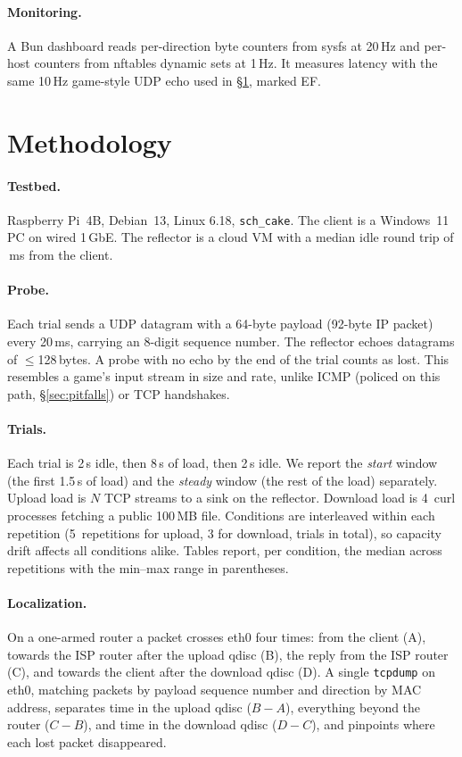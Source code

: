 \documentclass[10pt,twocolumn]{article}
\begin{document}
\paragraph{Monitoring.} A Bun dashboard reads per-direction byte counters from
sysfs at 20\,Hz and per-host counters from nftables dynamic sets at 1\,Hz. It
measures latency with the same 10\,Hz game-style UDP echo used in
\S\ref{sec:method}, marked EF.

\section{Methodology}\label{sec:method}
\paragraph{Testbed.} Raspberry Pi~4B, Debian~13, Linux 6.18, \texttt{sch\_cake}.
The client is a Windows~11 PC on wired 1\,GbE. The reflector is a cloud VM with a
median idle round trip of \idleMedian\,ms from the client.

\paragraph{Probe.} Each trial sends a UDP datagram with a 64-byte payload
(92-byte IP packet) every 20\,ms, carrying an 8-digit sequence number. The
reflector echoes datagrams of $\le$128\,bytes. A probe with no echo by the end of
the trial counts as lost. This resembles a game's input stream in size and rate,
unlike ICMP (policed on this path, \S\ref{sec:pitfalls}) or TCP handshakes.

\paragraph{Trials.} Each trial is 2\,s idle, then 8\,s of load, then 2\,s idle.
We report the \emph{start} window (the first 1.5\,s of load) and the
\emph{steady} window (the rest of the load) separately. Upload load is $N$ TCP
streams to a sink on the reflector. Download load is 4~curl processes fetching
a public 100\,MB file. Conditions are interleaved within each repetition
(5~repetitions for upload, 3 for download, \nTrials{} trials in total), so
capacity drift affects all conditions alike. Tables report, per condition, the
median across repetitions with the min--max range in parentheses.

\paragraph{Localization.} On a one-armed router a packet crosses eth0 four
times: from the client (A), towards the ISP router after the upload qdisc (B),
the reply from the ISP router (C), and towards the client after the download
qdisc (D). A single \texttt{tcpdump} on eth0, matching packets by payload
sequence number and direction by MAC address, separates time in the upload qdisc
($B-A$), everything beyond the router ($C-B$), and time in the download qdisc
($D-C$), and pinpoints where each lost packet disappeared.
\end{document}
